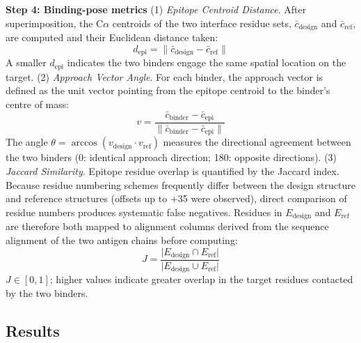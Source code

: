 \documentclass[11pt]{article}
\begin{document}
\textbf{Step 4: Binding-pose metrics} (1) \emph{Epitope Centroid Distance}. After superimposition, the C$\alpha$ centroids
of the two interface residue sets, $\bar{c}_{\mathrm{design}}$ and $\bar{c}_{\mathrm{ref}}$, are computed and their Euclidean distance taken:
\begin{equation*}
  d_{\mathrm{epi}} = \lVert \bar{c}_{\mathrm{design}} - \bar{c}_{\mathrm{ref}} \rVert
\end{equation*}
A smaller $d_{\mathrm{epi}}$ indicates the two binders engage the same spatial location on the target.
(2) \emph{Approach Vector Angle}. For each binder, the approach vector is defined as the unit vector pointing
from the epitope centroid to the binder's centre of mass:
\begin{equation*}
  v = \frac{\bar{c}_{\mathrm{binder}} - \bar{c}_{\mathrm{epi}}}{\lVert \bar{c}_{\mathrm{binder}} - \bar{c}_{\mathrm{epi}} \rVert}
\end{equation*}
The angle $\theta = \arccos(v_{\mathrm{design}} \cdot v_{\mathrm{ref}})$ measures the directional agreement between the two binders (0: identical
approach direction; 180: opposite directions).
(3) \emph{Jaccard Similarity}. Epitope residue overlap is quantified by the Jaccard index. Because residue
numbering schemes frequently differ between the design structure and reference structures (offsets up to
+35 were observed), direct comparison of residue numbers produces systematic false negatives. Residues in
$E_{\mathrm{design}}$ and $E_{\mathrm{ref}}$ are therefore both mapped to alignment columns derived from the sequence alignment of the
two antigen chains before computing:
\begin{equation*}
  J = \frac{\lvert E_{\mathrm{design}} \cap E_{\mathrm{ref}} \rvert}{\lvert E_{\mathrm{design}} \cup E_{\mathrm{ref}} \rvert}
\end{equation*}
$J \in [0, 1]$; higher values indicate greater overlap in the target residues contacted by the two binders.

\subsection{Results}
\end{document}
